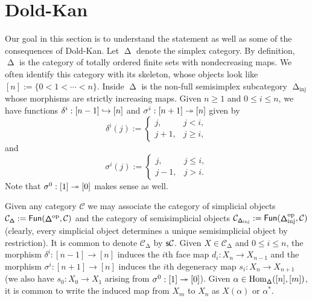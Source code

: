 \documentclass[11pt]{article}
\newcommand{\CC}{\mathcal{C}}
\DeclareMathOperator{\DDelta}{\mathsf{\Delta}} %
\DeclareMathOperator{\iinj}{inj} %
\begin{document}
\section{Dold-Kan}
Our goal in this section is to understand the statement as well as some of the consequences of Dold-Kan. Let $\DDelta$ denote the simplex category. By definition, $\DDelta$ is the category of totally ordered finite sets with nondecreasing maps. We often identify this category with its skeleton, whose objects look like $[n]:=\{0<1<\cdots<n\}$. Inside $\DDelta$ is the non-full semisimplex subcategory $\DDelta_{\iinj}$ whose morphisms are strictly increasing maps. Given $n\geq1$ and $0\leq i\leq n$, we have functions $\delta^i: [n-1]\hookrightarrow[n]$ and $\sigma^i: [n+1]\twoheadrightarrow[n]$ given by 
\begin{equation*}
\delta^i(j):=
\begin{cases}
j, & j<i, \\
j+1, & j\geq i,
\end{cases}
\end{equation*}
and
\begin{equation*}
\sigma^i(j):=
\begin{cases}
j, & j\leq i, \\
j-1, & j>i.
\end{cases}
\end{equation*}
Note that $\sigma^0: [1]\twoheadrightarrow[0]$ makes sense as well.

Given any category $\CC$ we may associate the category of simplicial objects $\CC_{\DDelta}:=\Fun(\DDelta^{\op},\CC)$ and the category of semisimplicial objects $\CC_{\DDelta_{\iinj}}:=\Fun(\DDelta_{\iinj}^{\op},\CC)$ (clearly, every simplicial object determines a unique semisimplicial object by restriction). It is common to denote $\CC_{\DDelta}$ by $\simp\CC$. Given $X\in\CC_{\DDelta}$ and $0\leq i\leq n$, the morphism $\delta^i: [n-1]\to[n]$ induces the $i$th face map $d_i: X_n\to X_{n-1}$ and the morphism $\sigma^i: [n+1]\to[n]$ induces the $i$th degeneracy map $s_i: X_n\to X_{n+1}$ (we also have $s_0: X_0\to X_1$ arising from $\sigma^0: [1]\twoheadrightarrow[0]$). Given $\alpha\in\Hom_{\DDelta}([n],[m])$, it is common to write the induced map from $X_m$ to $X_n$ as $X(\alpha)$ or $\alpha^*$.
\end{document}
